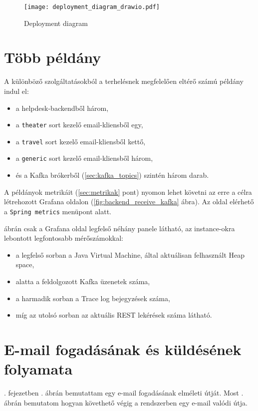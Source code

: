 \begin{figure}[hbt] 
	\centering
	\texttt{[image: deployment\_diagram\_drawio.pdf]}
	\caption[Deployment diagram]{Deployment diagram}
	\label{fig:deployment_diagram}
\end{figure}



\section{Több példány}
A különböző szolgáltatásokból a terhelésnek megfelelően eltérő számú példány indul el:

\begin{itemize}
	\item a helpdesk-backendből három,
	\item a \texttt{theater} sort kezelő email-kliensből egy,
	\item a \texttt{travel} sort kezelő email-kliensből kettő,
	\item a \texttt{generic} sort kezelő email-kliensből három,
	\item és a Kafka brókerből (\ref{sec:kafka_topics}) szintén három darab.
\end{itemize}

A példányok metrikáit (\ref{sec:metrikak} pont) nyomon lehet követni az erre a célra létrehozott Grafana oldalon (\ref{fig:backend_receive_kafka} ábra). Az oldal elérhető a  \texttt{Spring metrics} menüpont alatt.

 ábrán csak a Grafana oldal legfelső néhány panele látható, az instance-okra lebontott legfontosabb mérőszámokkal:

\begin{itemize}
	\item a legfelső sorban a Java Virtual Machine, által aktuálisan felhasznált Heap space,	
	\item alatta a feldolgozott Kafka üzenetek száma,
	\item a harmadik sorban a Trace log bejegyzések száma,
	\item míg az utolsó sorban az aktuális REST lekérések száma látható.
\end{itemize}



\section{E-mail fogadásának és küldésének folyamata}
. fejezetben . ábrán bemutattam egy e-mail fogadásának elméleti útját. Most . ábrán bemutatom hogyan követhető végig a rendszerben egy e-mail valódi útja.

